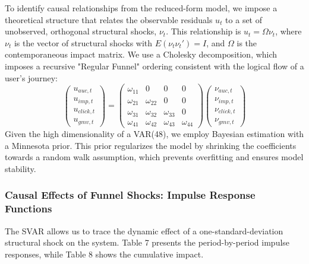 To identify causal relationships from the reduced-form model, we impose a theoretical structure that relates the observable residuals $u_t$ to a set of unobserved, orthogonal structural shocks, $\nu_t$. This relationship is $u_t = \Omega \nu_t$, where $\nu_t$ is the vector of structural shocks with $E(\nu_t \nu_t') = I$, and $\Omega$ is the contemporaneous impact matrix. We use a Cholesky decomposition, which imposes a recursive "Regular Funnel" ordering consistent with the logical flow of a user's journey:
\begin{equation}
\begin{pmatrix} u_{auc,t} \\ u_{imp,t} \\ u_{click,t} \\ u_{gmv,t} 
\end{pmatrix} = 
\begin{pmatrix} \omega_{11} & 0 & 0 & 0 \\ \omega_{21} & \omega_{22} & 0 & 0 \\ \omega_{31} & \omega_{32} & \omega_{33} & 0 \\ \omega_{41} & \omega_{42} & \omega_{43} & \omega_{44} 
\end{pmatrix}
\begin{pmatrix} \nu_{auc,t} \\ \nu_{imp,t} \\ \nu_{click,t} \\ \nu_{gmv,t} 
\end{pmatrix}
\end{equation}
Given the high dimensionality of a VAR(48), we employ Bayesian estimation with a Minnesota prior. This prior regularizes the model by shrinking the coefficients towards a random walk assumption, which prevents overfitting and ensures model stability.

\subsubsection{Causal Effects of Funnel Shocks: Impulse Response Functions}
The SVAR allows us to trace the dynamic effect of a one-standard-deviation structural shock on the system. Table 7 presents the period-by-period impulse responses, while Table 8 shows the cumulative impact.

